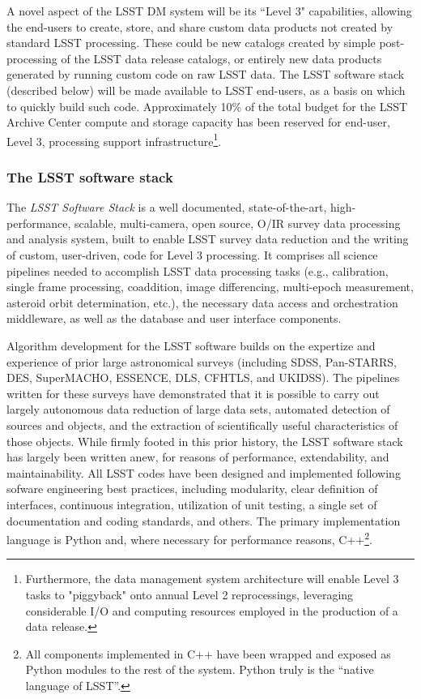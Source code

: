 A novel aspect of the LSST DM system will be its ``Level 3"
capabilities, allowing the end-users to create, store, and share
custom data products not created by standard LSST processing. These
could be new catalogs created by simple post-processing of the LSST
data release catalogs, or entirely new data products generated by
running custom code on raw LSST data. The LSST software stack (described
below) will be made available to LSST end-users, as a basis on which
to quickly build such code. Approximately 10\% of the total
budget for the LSST Archive Center compute and storage capacity has
been reserved for end-user, Level 3, processing support
infrastructure\footnote{Furthermore, the data management system
architecture will enable Level 3 tasks to "piggyback" onto annual
Level 2 reprocessings, leveraging considerable I/O and
computing resources employed in the production of a data release.}.

\subsubsection{The LSST software stack}
\label{sec:dmstack}

The {\em LSST Software Stack} is a well documented, state-of-the-art,
high-performance, scalable, multi-camera, open source, O/IR survey
data processing and analysis system, built to enable LSST survey data
reduction and the writing of custom, user-driven, code for Level 3
processing. It comprises
all science pipelines needed to accomplish LSST data processing tasks
(e.g., calibration, single frame processing, coaddition, image
differencing, multi-epoch measurement, asteroid orbit determination,
etc.), the necessary data
access and orchestration middleware, as well as the database and user
interface components.

Algorithm development for the LSST software builds on the expertize
and experience of prior large astronomical surveys (including SDSS,
Pan-STARRS, DES,
SuperMACHO, ESSENCE,  DLS, CFHTLS, and UKIDSS). The pipelines written
for these surveys have demonstrated that it is possible to carry out
largely autonomous data
reduction of large data sets, automated detection of sources and
objects, and the
extraction of scientifically useful characteristics of those objects.
While firmly footed in this prior history, the LSST software stack has
largely been written anew, for reasons of performance, extendability, and
maintainability. All LSST codes have been designed and implemented
following sofware engineering best practices, including modularity, clear definition
of interfaces, continuous integration,
utilization of unit testing, a single set of documentation and coding
standards, and others. The primary implementation language is Python and, where
necessary for performance reasons, C++\footnote{All components implemented
in C++ have been wrapped and exposed as Python modules to the rest of the system. Python truly is the ``native language of LSST''.}.

